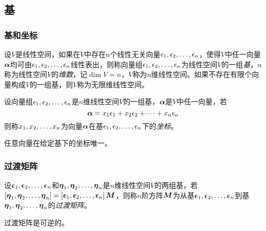 \documentclass{ctexart}
\begin{document}
\subsection{基}

\subsubsection*{基和坐标}

\begin{definition}[基]
    设\(V\)是线性空间，如果在\(V\)中存在\(n\)个线性无关向量\(\enums{\epsilon}{n}\)，使得\(V\)中任一向量\(\vecal\)均可由\(\enums{\epsilon}{n}\)线性表出，则称向量组\(\enums{\epsilon}{n}\)为线性空间\(V\)的一组\emph{基}，\(n\)称为线性空间\(V\)的\emph{维数}，记\(\dim{V}=n\)，\(V\)称为\(n\)维线性空间。如果不存在有限个向量构成\(V\)的一组基，则\(V\)称为无限维线性空间。
\end{definition}

\begin{definition}[坐标]
    设向量组\(\enums{\epsilon}{n}\)是\(n\)维线性空间\(V\)的一组基，\(\vecal\)是\(V\)中任一向量，若
    \begin{equation*}
        \vecal=x_1\epsilon_1+x_2\epsilon_2+\cdots+x_n\epsilon_n
    \end{equation*}
    则称\(\enums{x}{n}\)为向量\(\vecal\)在基\(\enums{\epsilon}{n}\)下的\emph{坐标}。
\end{definition}

\begin{theorem}
    任意向量在给定基下的坐标唯一。
\end{theorem}

\subsubsection*{过渡矩阵}

\begin{definition}[过渡矩阵]
    设\(\enums{\veceps}{n}\)和\(\enums{\veceta}{n}\)是\(n\)维线性空间\(V\)的两组基，若\(\mat{\enums{\veceta}{n}}=\mat{\enums{\veceps}{n}}\matm\)，则称\(n\)阶方阵\(\matm\)为从基\(\enums{\veceps}{n}\)到基\(\enums{\veceta}{n}\)的\emph{过渡矩阵}。
\end{definition}

\begin{theorem}
    过渡矩阵是可逆的。
\end{theorem}
\end{document}
